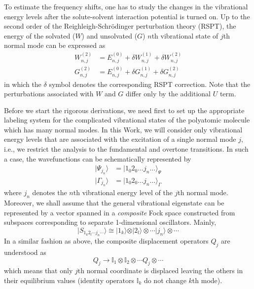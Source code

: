 \documentclass[a4paper,titlepage,twoside,fleqn,12pt]{book}
\begin{document}
\begin{refsection}
To estimate the frequency shifts, one has to study the changes
in the vibrational energy levels after the solute\hyp{}solvent 
interaction potential is turned on. Up to the second order
of the Reighleigh\hyp{}Schr{\"o}dinger perturbation theory (RSPT), 
the energy of the solvated ($W$) and unsolvated ($G$) 
$n$th vibrational state of $j$th normal mode can be expressed as
%
\begin{eqnarray}\label{e:gwlevels}
W_{n,j}^{(2)} &= E_{n,j}^{(0)} + \delta W_{n,j}^{(1)} + \delta W_{n,j}^{(2)} \\
G_{n,j}^{(2)} &= E_{n,j}^{(0)} + \delta G_{n,j}^{(1)} + \delta G_{n,j}^{(2)}
\end{eqnarray}
%
in which the $\delta$ symbol denotes the corresponding RSPT correction. Note 
that the perturbations associated with $W$ and $G$ differ only by 
the additional $U$ term. 

Before we start the rigorous derivations, we need first to set up the appropriate labeling system
for the complicated vibrational states of the polyatomic molecule which has many normal modes.
In this Work, we will consider only vibrational energy levels that are associated with
the excitation of a single normal mode $j$, i.e., we restrict the analysis to the fundamental
and overtone transitions. In such a case, the 
wavefunctions can be schematically represented by
%
\begin{eqnarray}
\vert \Psi_{j_n}   \rangle &= \vert 1_0 2_0 \ldots j_n \ldots \rangle_{\Psi} \\
\vert \Gamma_{j_n} \rangle &= \vert 1_0 2_0 \ldots j_n \ldots \rangle_{\Gamma} 
\end{eqnarray}
%
where $j_n$ denotes the $n$th vibrational energy level of the $j$th normal mode.
Moreover, we shall assume that the general vibrational 
eigenstate can be represented by a vector spanned
in a \emph{composite} Fock space constructed from subspaces corresponding 
to separate 1\hyp{}dimensional oscillators. Mainly,
%
\begin{equation}  \label{eq:general_state_vibr}
\vert S_{1_k2_l\cdots j_n\cdots}   \rangle 
 \cong \vert 1_k \rangle \otimes \vert 2_l \rangle \otimes \cdots \vert j_n \rangle \otimes \cdots 
\end{equation}
%
In a similar fashion as above, the composite displacement operators $Q_j$
are understood as
%
\begin{equation}
Q_j \rightarrow \mathbb{I}_1 \otimes \mathbb{I}_2 \otimes \cdots Q_j \otimes \cdots
\end{equation}
%
which means that only $j$th normal coordinate is displaced leaving the others
in their equilibrium values (identity operators $\mathbb{I}_k$ do not change $k$th mode).


\end{refsection}
\end{document}

